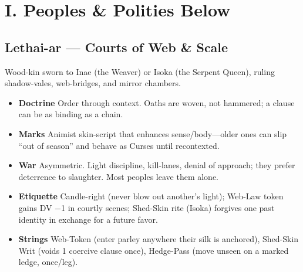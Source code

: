 \documentclass[11pt]{article}
\begin{document}

\section{I. Peoples \& Polities Below}

\subsection{Lethai-ar --- Courts of Web \& Scale}
Wood-kin sworn to Inae (the Weaver) or Isoka (the Serpent Queen), ruling shadow-vales, web-bridges, and mirror chambers.
\begin{itemize}
    \item \textbf{Doctrine} Order through context. Oaths are woven, not hammered; a clause can be as binding as a chain.
    \item \textbf{Marks} Animist skin-script that enhances sense/body---older ones can slip ``out of season'' and behave as Curses until recontexted.
    \item \textbf{War} Asymmetric. Light discipline, kill-lanes, denial of approach; they prefer deterrence to slaughter. Most peoples leave them alone.
    \item \textbf{Etiquette} Candle-right (never blow out another's light); Web-Law token gains DV −1 in courtly scenes; Shed-Skin rite (Isoka) forgives one past identity in exchange for a future favor.
    \item \textbf{Strings} Web-Token (enter parley anywhere their silk is anchored), Shed-Skin Writ (voids 1 coercive clause once), Hedge-Pass (move unseen on a marked ledge, once/leg).
\end{itemize}
\end{document}
